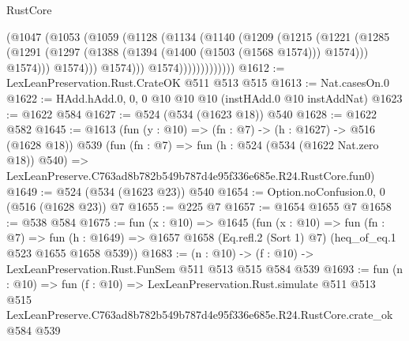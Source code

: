 \begin{lexlean}{RustCore}
\begin{coremodule}
                          (@1047
                            (@1053
                              (@1059
                                (@1128
                                  (@1134
                                    (@1140
                                      (@1209
                                        (@1215
                                          (@1221
                                            (@1285
                                              (@1291
                                                (@1297
                                                  (@1388
                                                    (@1394 (@1400 (@1503 (@1568 @1574))) @1574)))
                                                @1574)))
                                          @1574)))
                                    @1574)))
                              @1574)))))))))))))
@1612 := LexLeanPreservation.Rust.CrateOK @511 @513 @515
@1613 := Nat.casesOn.{0}
@1622 := HAdd.hAdd.{0, 0, 0} @10 @10 @10 (instHAdd.{0} @10 instAddNat)
@1623 := @1622 @584
@1627 := @524 (@534 (@1623 @18)) @540
@1628 := @1622 @582
@1645 := @1613
    (fun (y : @10) => (fn : @7) -> (h : @1627) -> @516 (@1628 @18))
    @539
    (fun (fn : @7) =>
    fun (h : @524 (@534 (@1622 Nat.zero @18)) @540) =>
    LexLeanPreserve.C763ad8b782b549b787d4e95f336e685e.R24.RustCore.fun0)
@1649 := @524 (@534 (@1623 @23)) @540
@1654 := Option.noConfusion.{0, 0} (@516 (@1628 @23)) @7
@1655 := @225 @7
@1657 := @1654 @1655 @7
@1658 := @538 @584
@1675 := fun (x : @10) =>
  @1645
    (fun (x : @10) =>
    fun (fn : @7) =>
    fun (h : @1649) => @1657 @1658 (Eq.refl.{2} (Sort 1) @7) (heq_of_eq.{1} @523 @1655 @1658 @539))
@1683 := (n : @10) -> (f : @10) -> LexLeanPreservation.Rust.FunSem @511 @513 @515 @584 @539
@1693 := fun (n : @10) =>
  fun (f : @10) =>
  LexLeanPreservation.Rust.simulate
    @511
    @513
    @515
    LexLeanPreserve.C763ad8b782b549b787d4e95f336e685e.R24.RustCore.crate_ok
    @584
    @539
\end{coremodule}
\end{lexlean}
